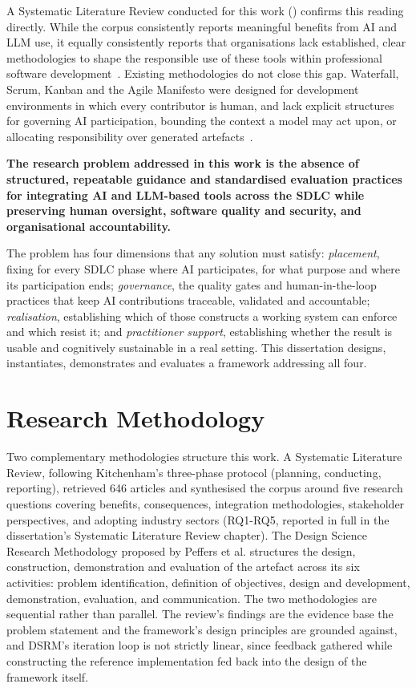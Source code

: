 \documentclass[sigconf,review=false]{acmart}
\begin{document}
A Systematic Literature Review conducted for this work () confirms this reading directly. While the corpus consistently reports meaningful benefits from AI and LLM use, it equally consistently reports that organisations lack established, clear methodologies to shape the responsible use of these tools within professional software development~\cite{Banh:2025cf, Farhanna:2025eu, Hemmat:2025rd, Gao:2025cc}. Existing methodologies do not close this gap. Waterfall, Scrum, Kanban and the Agile Manifesto were designed for development environments in which every contributor is human, and lack explicit structures for governing AI participation, bounding the context a model may act upon, or allocating responsibility over generated artefacts~\cite{Zhang:2025ea}.

\noindent\textbf{The research problem addressed in this work is the absence of structured, repeatable guidance and standardised evaluation practices for integrating AI and LLM-based tools across the SDLC while preserving human oversight, software quality and security, and organisational accountability.}

The problem has four dimensions that any solution must satisfy: \emph{placement}, fixing for every SDLC phase where AI participates, for what purpose and where its participation ends; \emph{governance}, the quality gates and human-in-the-loop practices that keep AI contributions traceable, validated and accountable; \emph{realisation}, establishing which of those constructs a working system can enforce and which resist it; and \emph{practitioner support}, establishing whether the result is usable and cognitively sustainable in a real setting. This dissertation designs, instantiates, demonstrates and evaluates a framework addressing all four.

\section{Research Methodology}
\label{sec:methods}

Two complementary methodologies structure this work. A Systematic Literature Review, following Kitchenham's three-phase protocol (planning, conducting, reporting), retrieved 646 articles and synthesised the corpus around five research questions covering benefits, consequences, integration methodologies, stakeholder perspectives, and adopting industry sectors (RQ1-RQ5, reported in full in the dissertation's Systematic Literature Review chapter). The Design Science Research Methodology proposed by Peffers et al. structures the design, construction, demonstration and evaluation of the artefact across its six activities: problem identification, definition of objectives, design and development, demonstration, evaluation, and communication. The two methodologies are sequential rather than parallel. The review's findings are the evidence base the problem statement and the framework's design principles are grounded against, and DSRM's iteration loop is not strictly linear, since feedback gathered while constructing the reference implementation fed back into the design of the framework itself.
\end{document}
